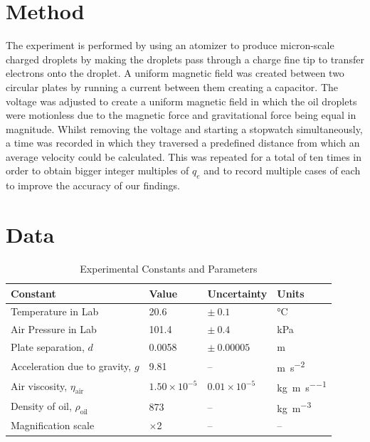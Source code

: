 \documentclass{article}
\begin{document}
\section{Method}
The experiment is performed by using an atomizer to produce micron-scale charged droplets by making the droplets pass through a charge fine tip to transfer electrons onto the droplet. A uniform magnetic field was created between two circular plates by running a current between them creating a capacitor. The voltage was adjusted to create a uniform magnetic field in which the oil droplets were motionless due to the magnetic force and gravitational force being equal in magnitude. Whilst removing the voltage and starting a stopwatch simultaneously, a time was recorded in which they traversed a predefined distance from which an average velocity could be calculated. This was repeated for a total of ten times in order to obtain bigger integer multiples of $q_e$ and to record multiple cases of each to improve the accuracy of our findings.


\section{Data}
\begin{table}[h]
\centering
\caption{Experimental Constants and Parameters}
\label{tab:constants}
\begin{tabular}{llll}
\toprule
\textbf{Constant} & \textbf{Value} & \textbf{Uncertainty} & \textbf{Units} \\
\midrule
Temperature in Lab & 20.6 & $\pm \ 0.1$ & \unit{\celsius} \\
Air Pressure in Lab & 101.4 & $\pm \ 0.4$ & \unit{\kilo\pascal} \\
Plate separation, $d$ & 0.0058 & $\pm \ 0.00005$ & \unit{\meter} \\
Acceleration due to gravity, $g$ & 9.81 & -- & \unit{\meter\per\second\squared} \\
Air viscosity, $\eta_{\text{air}}$ & $1.50 \times 10^{-5}$ & $0.01\times10^{-5}$ & \unit{\kilo\gram\per\meter\per\second} \\
Density of oil, $\rho_{\text{oil}}$ & 873 & -- & \unit{\kilo\gram\per\meter\cubed} \\
Magnification scale & $\times$2 & -- & -- \\
\bottomrule
\end{tabular}
\end{table}
\end{document}
